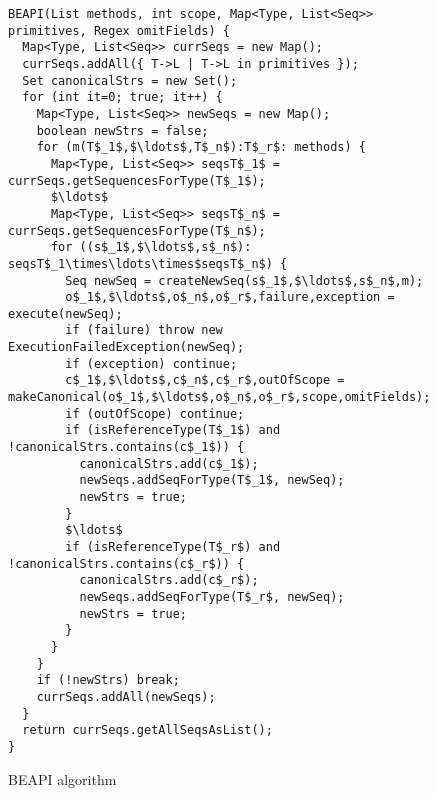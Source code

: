 \begin{figure}[t!]
\begin{lstlisting}
BEAPI(List methods, int scope, Map<Type, List<Seq>> primitives, Regex omitFields) {
  Map<Type, List<Seq>> currSeqs = new Map();
  currSeqs.addAll({ T->L | T->L in primitives });
  Set canonicalStrs = new Set();
  for (int it=0; true; it++) {
    Map<Type, List<Seq>> newSeqs = new Map();
    boolean newStrs = false;
    for (m(T$_1$,$\ldots$,T$_n$):T$_r$: methods) {
      Map<Type, List<Seq>> seqsT$_1$ = currSeqs.getSequencesForType(T$_1$);
      $\ldots$ 
      Map<Type, List<Seq>> seqsT$_n$ = currSeqs.getSequencesForType(T$_n$);
      for ((s$_1$,$\ldots$,s$_n$): seqsT$_1\times\ldots\times$seqsT$_n$) {
        Seq newSeq = createNewSeq(s$_1$,$\ldots$,s$_n$,m);
        o$_1$,$\ldots$,o$_n$,o$_r$,failure,exception = execute(newSeq);
        if (failure) throw new ExecutionFailedException(newSeq);
        if (exception) continue;
        c$_1$,$\ldots$,c$_n$,c$_r$,outOfScope = makeCanonical(o$_1$,$\ldots$,o$_n$,o$_r$,scope,omitFields);
        if (outOfScope) continue;
        if (isReferenceType(T$_1$) and !canonicalStrs.contains(c$_1$)) {
          canonicalStrs.add(c$_1$);
          newSeqs.addSeqForType(T$_1$, newSeq);
          newStrs = true;
        }
        $\ldots$
        if (isReferenceType(T$_r$) and !canonicalStrs.contains(c$_r$)) {
          canonicalStrs.add(c$_r$);
          newSeqs.addSeqForType(T$_r$, newSeq);
          newStrs = true;
        }
      }
    }
    if (!newStrs) break;
    currSeqs.addAll(newSeqs);
  }
  return currSeqs.getAllSeqsAsList();
}
\end{lstlisting}
\caption{\textsf{BEAPI} algorithm}
\label{alg:beapi}
\end{figure}


